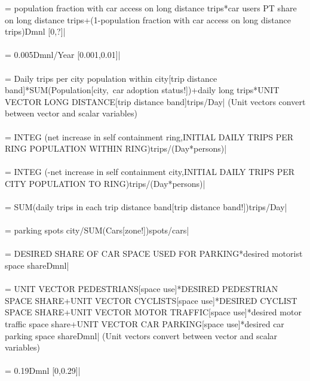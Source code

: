  = population fraction with car access on long distance trips*car users PT share on long distance trips+(1-population fraction with car access on long distance trips)Dmnl [0,?]| \\ \\ 
 = 0.005Dmnl/Year [0.001,0.01]| \\ \\ 
 = Daily trips per city population within city[trip distance band]*SUM(Population[city,\ car adoption status!])+daily long trips*UNIT VECTOR LONG DISTANCE[trip distance band]trips/Day| (Unit vectors convert between vector and scalar variables) \\ \\ 
 =  INTEG (net increase in self containment ring,INITIAL DAILY TRIPS PER RING POPULATION WITHIN RING)trips/(Day*persons)| \\ \\ 
 =  INTEG (-net increase in self containment city,INITIAL DAILY TRIPS PER CITY POPULATION TO RING)trips/(Day*persons)| \\ \\ 
 = SUM(daily trips in each trip distance band[trip distance band!])trips/Day| \\ \\ 
 = parking spots city/SUM(Cars[zone!])spots/cars| \\ \\ 
 = DESIRED SHARE OF CAR SPACE USED FOR PARKING*desired motorist space shareDmnl| \\ \\ 
 = UNIT VECTOR PEDESTRIANS[space use]*DESIRED PEDESTRIAN SPACE SHARE+UNIT VECTOR CYCLISTS[space use]*DESIRED CYCLIST SPACE SHARE+UNIT VECTOR MOTOR TRAFFIC[space use]*desired motor traffic space share+UNIT VECTOR CAR PARKING[space use]*desired car parking space shareDmnl| (Unit vectors convert between vector and scalar variables) \\ \\ 
 = 0.19Dmnl [0,0.29]| \\ \\ 
